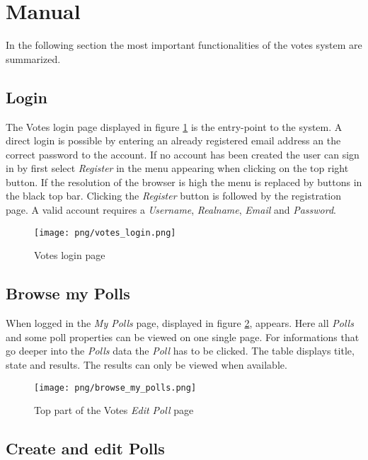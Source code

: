 \section{Manual}
In the following section the most important functionalities of the votes system are summarized.

\subsection{Login}

The Votes login page displayed in figure \ref{F:votes_login} is the entry-point to the system. A direct login is possible by entering an already registered email address an the correct password to the account. If no account has been created the user can sign in by first select \textit{Register} in the menu appearing when clicking on the top right button. If the resolution of the browser is high the menu is replaced by buttons in the black top bar. Clicking the \textit{Register} button is followed by the registration page. A valid account requires a \textit{Username}, \textit{Realname}, \textit{Email} and \textit{Password}.

\begin{figure}
\centering
\texttt{[image: png/votes\_login.png]}
\caption{Votes login page}
\label{F:votes_login}
\end{figure}

\subsection{Browse my Polls}
When logged in the \textit{My Polls} page, displayed in figure \ref{F:browse_my_polls}, appears. Here all \textit{Polls} and some poll properties can be viewed on one single page. For informations that go deeper into the \textit{Polls} data the \textit{Poll} has to be clicked. The table displays title, state and results. The results can only be viewed when available.

\begin{figure}
\centering
\texttt{[image: png/browse\_my\_polls.png]}
\caption{Top part of the Votes \textit{Edit Poll} page}
\label{F:browse_my_polls}
\end{figure}



\subsection{Create and edit Polls}

